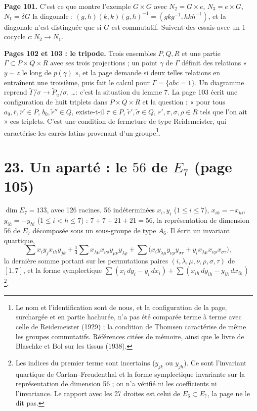 \documentclass[11pt,a4paper]{article}
\begin{document}
\textbf{Page 101.} C'est ce que montre l'exemple $G \times G$ avec $N_2 = G
\times e$, $N_3 = e \times G$, $N_1 = \delta G$ la diagonale : $(g, h)(k, k)(g,
h)^{-1} = (gkg^{-1}, hkh^{-1})$, et la diagonale n'est distinguée que si $G$ est
commutatif. Suivent des essais avec un 1-cocycle $c : N_2 \to N_1$.

\textbf{Pages 102 et 103 : le tripode.} Trois ensembles $P, Q, R$ et une partie
$\Gamma \subset P \times Q \times R$ avec ses trois projections ; un point
$\gamma$ de $\Gamma$ définit des relations « $y \sim z$ le long de $p(\gamma)$ »,
et la page demande si deux telles relations en entraînent une troisième, puis
fait le calcul pour $\Gamma = \lbrace abc = 1\rbrace$. Un diagramme reprend
$\widetilde\Gamma/\sigma \to \widetilde P_u/\sigma$, \ldots : c'est la
situation du lemme 7. La page 103 écrit une configuration de huit triplets
dans $P \times Q \times R$ et la question : « pour tous $a_0, \bar r, \bar r'
\in P$, $b_0, \tilde r'' \in Q$, existe-t-il $\bar\pi \in P$, $\tilde r',
\tilde\sigma \in Q$, $r', \pi, \sigma, \rho \in R$ tels que l'on ait » ces
triplets. C'est une condition de fermeture de type Reidemeister, qui
caractérise les carrés latins provenant d'un groupe\footnote{Le nom et
l'identification sont de nous, et la configuration de la page, surchargée et
en partie hachurée, n'a pas été comparée terme à terme avec celle de
Reidemeister (1929) ; la condition de Thomsen caractérise de même les groupes
commutatifs. Références citées de mémoire, ainsi que le livre de Blaschke et
Bol sur les tissus (1938).}.

\section*{23. Un aparté : le $56$ de $E_7$ (page 105)}

$\dim E_7 = 133$, avec 126 racines. 56 indéterminées $x_i, y_i$ ($1 \leq i
\leq 7$), $x_{ih} = -x_{hi}$, $y_{ih} = -y_{hi}$ ($1 \leq i < h \leq 7$) :
$7 + 7 + 21 + 21 = 56$, la représentation de dimension 56 de $E_7$ décomposée
sous un sous-groupe de type $A_6$. Il écrit un invariant quartique,
\[
\sum x_i y_j x_{ih} y_{jk} + \tfrac14 \sum x_{\lambda\mu} x_{\nu\rho}
y_{\mu\nu} y_{\lambda\rho} + \sum \bigl(x_i y_{\lambda\mu} y_{\nu\rho}
y_{\sigma\tau} + y_i x_{\lambda\mu} x_{\nu\rho} x_{\sigma\tau}\bigr),
\]
la dernière somme portant sur les permutations paires $(i, \lambda, \mu, \nu,
\rho, \sigma, \tau)$ de $[1, 7]$, et la forme symplectique $\sum (x_i\, dy_i -
y_i\, dx_i) + \sum (x_{ih}\, dy_{ih} - y_{ih}\, dx_{ih})$\footnote{Les indices
du premier terme sont incertains ($y_{jk}$ ou $y_{jh}$). Ce sont l'invariant
quartique de Cartan--Freudenthal et la forme symplectique invariante sur la
représentation de dimension 56 ; on n'a vérifié ni les coefficients ni
l'invariance. Le rapport avec les 27 droites est celui de $E_6 \subset E_7$,
la page ne le dit pas.}.
\end{document}
